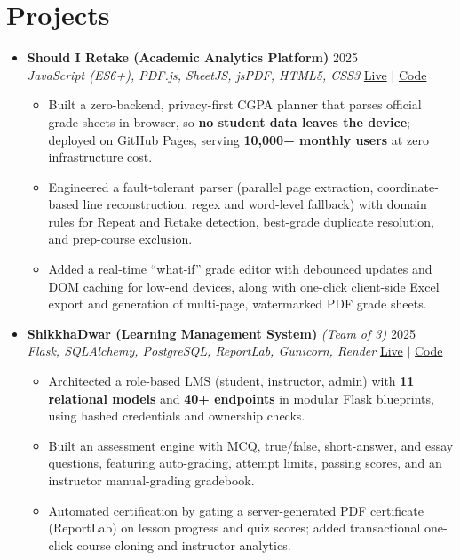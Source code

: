 \documentclass[a4paper]{article}
\newcommand{\resumeItem}[1]{
  \item\small{
    {#1 \vspace{-2pt}}
  }
}
\newcommand{\resumeItemListStart}{\begin{itemize}}
\newcommand{\resumeItemListEnd}{\end{itemize}\vspace{-5pt}}
\begin{document}
\section{Projects}
  \begin{itemize}[leftmargin=0.15in, label={}, itemsep=6pt]

    \item
    \textbf{Should I Retake (Academic Analytics Platform)} \hfill 2025\\
    \small\textit{JavaScript (ES6+), PDF.js, SheetJS, jsPDF, HTML5, CSS3} \hfill
    \href{https://badhon495.github.io/should-i-retake/}{Live} $|$
    \href{https://github.com/badhon495/should-i-retake}{Code}
    \vspace{-5pt}
    \resumeItemListStart
      \resumeItem{Built a zero-backend, privacy-first CGPA planner that parses official grade sheets in-browser, so \textbf{no student data leaves the device}; deployed on GitHub Pages, serving \textbf{10,000+ monthly users} at zero infrastructure cost.}
      \resumeItem{Engineered a fault-tolerant parser (parallel page extraction, coordinate-based line reconstruction, regex and word-level fallback) with domain rules for Repeat and Retake detection, best-grade duplicate resolution, and prep-course exclusion.}
      \resumeItem{Added a real-time ``what-if'' grade editor with debounced updates and DOM caching for low-end devices, along with one-click client-side Excel export and generation of multi-page, watermarked PDF grade sheets.}
    \resumeItemListEnd

    \item
    \textbf{ShikkhaDwar (Learning Management System)} \textit{\small (Team of 3)} \hfill 2025\\
    \small\textit{Flask, SQLAlchemy, PostgreSQL, ReportLab, Gunicorn, Render} \hfill
    \href{https://shikkhadwar-81r2.onrender.com/}{Live} $|$
    \href{https://github.com/nihal-kabir/ShikkhaDwar}{Code}
    \vspace{-5pt}
    \resumeItemListStart
      \resumeItem{Architected a role-based LMS (student, instructor, admin) with \textbf{11 relational models} and \textbf{40+ endpoints} in modular Flask blueprints, using hashed credentials and ownership checks.}
      \resumeItem{Built an assessment engine with MCQ, true/false, short-answer, and essay questions, featuring auto-grading, attempt limits, passing scores, and an instructor manual-grading gradebook.}
      \resumeItem{Automated certification by gating a server-generated PDF certificate (ReportLab) on lesson progress and quiz scores; added transactional one-click course cloning and instructor analytics.}
    \resumeItemListEnd


\end{itemize}
\end{document}
